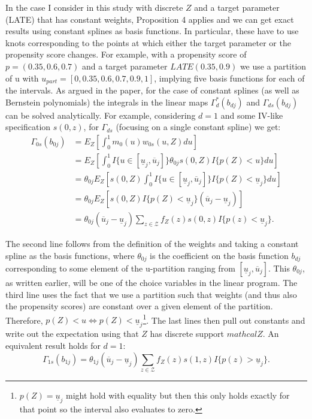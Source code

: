 \documentclass[11pt, a4paper, leqno]{article}
\begin{document}
In the case I consider in this study with discrete $Z$ and a target parameter (LATE) that has constant weights, Proposition 4 applies and we can get exact results using constant splines as basis functions.
In particular, these have to use knots corresponding to the points at which either the target parameter or the propensity score changes.
For example, with a propensity score of $p=(0.35, 0.6, 0.7)$ and a target parameter $LATE(0.35, 0.9)$ we use a partition of u with $u_{part} = [0, 0.35, 0.6, 0.7, 0.9, 1]$, implying five basis functions for each of the intervals.
As argued in the paper, for the case of constant splines (as well as Bernstein polynomials) the integrals in the linear maps $\Gamma^*_d(b_{dj})$ and $\Gamma_{ds}(b_{dj})$ can be solved analytically. For example, considering $d=1$ and some IV-like specification $s(0,z)$, for $\Gamma_{ds}$ (focusing on a single constant spline) we get:
\begin{equation}
    \begin{split}
    \Gamma_{0s}(b_{0j}) & = E_Z\left[\int_0^1 m_0(u)w_{0s}(u,Z)du\right] \\
     & = E_Z\left[\int_0^1 I\{u\in[\underline{u}_j, \overline{u}_j]\}\theta_{0j} s(0, Z) I\{p(Z)<u\}du\right] \\
     & = \theta_{0j}E_Z\left[s(0,Z)\int_0^1 I\{u\in[\underline{u}_j, \overline{u}_j]\}I\{p(Z)<\underline{u}_j\}du\right] \\
     & = \theta_{0j}E_Z\left[s(0,Z)I\{p(Z)<\underline{u}_j\}(\overline{u}_j-\underline{u}_j)\right] \\
     & = \theta_{0j}(\overline{u}_j-\underline{u}_j)\sum_{z\in \mathcal{Z}}f_Z(z) s(0,z) I\{p(z)< \underline{u}_j\}.
    \end{split}
\end{equation}

The second line follows from the definition of the weights and taking a constant spline as the basis functions, where $\theta_{0j}$ is the coefficient on the basis function $b_{dj}$ corresponding to some element of the u-partition ranging from $[\underline{u}_j,\overline{u}_j]$.
This $\theta_{0j}$, as written earlier, will be one of the choice variables in the linear program. The third line uses the fact that we use a partition such that weights (and thus also the propensity scores) are constant over a given element of the partition.
Therefore, $p(Z)<u \iff p(Z)<\underline{u}_j$\footnote{$p(Z) = \underline{u}_j$ might hold with equality but then this only holds exactly for that point so the interval also evaluates to zero.}.
The last lines then pull out constants and write out the expectation using that $Z$ has discrete support $mathcal{Z}$.
An equivalent result holds for $d=1$:
\begin{equation}
    \Gamma_{1s}(b_{1j}) = \theta_{1j}(\overline{u}_j-\underline{u}_j)\sum_{z\in \mathcal{Z}}f_Z(z) s(1,z) I\{p(z)> \underline{u}_j\}.
\end{equation}
\end{document}
